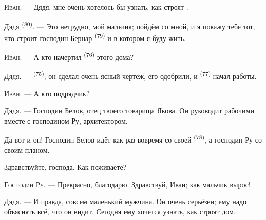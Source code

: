 %
%

\VUsaut{6.0mm}
\VUsaut{1.4mm}
\VUsaut{2.2mm}

\VUsaut{3.0mm}

\textsc{Иван}. --- Дядя, мне очень хотелось бы узнать, как строят
.

\textsc{Дядя} \textsuperscript{(80)}. --- Это нетрудно, мой мальчик; пойдём со
мной, и я покажу тебе тот, что строит господин Бернар \textsuperscript{(79)} и в
котором я буду жить.

\textsc{Иван}. --- А кто начертил  \textsuperscript{(76)} этого дома?

\textsc{Дядя}. ---  \textsuperscript{(75)}; он сделал очень
ясный чертёж, его одобрили, и  \textsuperscript{(77)} начал
работы.

\textsc{Иван}. --- А кто подрядчик?

\textsc{Дядя}. --- Господин Белов, отец твоего товарища Якова. Он
руководит рабочими вместе с господином Ру, архитектором.

Да вот и он! Господин Белов идёт как раз вовремя со своей
 \textsuperscript{(78)}, а господин Ру со своим планом.

Здравствуйте, господа. Как поживаете?

\textsc{Господин Ру}. --- Прекрасно, благодарю. Здравствуй, Иван; как
мальчик вырос!

\textsc{Дядя}. --- И правда, совсем маленький мужчина. Он очень серьёзен;
ему надо объяснять всё, что он видит. Сегодня ему хочется узнать, как
строят дом.

